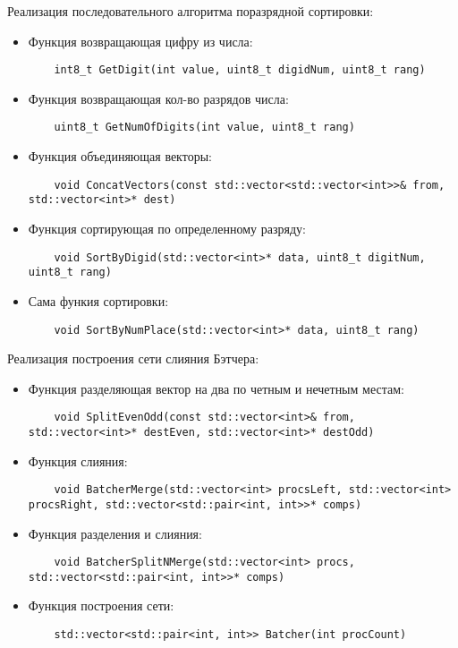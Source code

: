 \documentclass{report}
\begin{document}
Реализация последовательного алгоритма поразрядной сортировки:
\begin{itemize}
\item Функция возвращающая цифру из числа:
\begin{lstlisting}
	int8_t GetDigit(int value, uint8_t digidNum, uint8_t rang)
\end{lstlisting}
\item Функция возвращающая кол-во разрядов числа:
\begin{lstlisting}
	uint8_t GetNumOfDigits(int value, uint8_t rang)
\end{lstlisting}
\item Функция объединяющая векторы:
\begin{lstlisting}
	void ConcatVectors(const std::vector<std::vector<int>>& from, std::vector<int>* dest)
\end{lstlisting}
\item Функция сортирующая по определенному разряду:
\begin{lstlisting}
	void SortByDigid(std::vector<int>* data, uint8_t digitNum, uint8_t rang)
\end{lstlisting}
\item Сама функия сортировки:
\begin{lstlisting}
	void SortByNumPlace(std::vector<int>* data, uint8_t rang)
\end{lstlisting}
\end{itemize}

Реализация построения сети слияния Бэтчера:
\begin{itemize}
\item Функция разделяющая вектор на два по четным и нечетным местам:
\begin{lstlisting}
	void SplitEvenOdd(const std::vector<int>& from, std::vector<int>* destEven, std::vector<int>* destOdd)
\end{lstlisting}
\item Функция слияния:
\begin{lstlisting}
	void BatcherMerge(std::vector<int> procsLeft, std::vector<int> procsRight, std::vector<std::pair<int, int>>* comps)
\end{lstlisting}
\item Функция разделения и слияния:
\begin{lstlisting}
	void BatcherSplitNMerge(std::vector<int> procs, std::vector<std::pair<int, int>>* comps)
\end{lstlisting}
\item Функция построения сети:
\begin{lstlisting}
	std::vector<std::pair<int, int>> Batcher(int procCount)
\end{lstlisting}
\end{itemize}
\end{document}
